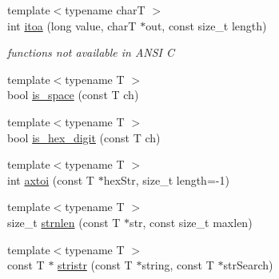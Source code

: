 \begin{DoxyCompactItemize}
\item 
\hypertarget{namespacestring__util_ad8c0e55cfd7dd74b275abd8f00d0bbd9}{{\footnotesize template$<$typename char\-T $>$ }\\int \hyperlink{namespacestring__util_ad8c0e55cfd7dd74b275abd8f00d0bbd9}{itoa} (long value, char\-T $\ast$out, const size\-\_\-t length)}\label{namespacestring__util_ad8c0e55cfd7dd74b275abd8f00d0bbd9}

\begin{DoxyCompactList}\small\item\em functions not available in A\-N\-S\-I C \end{DoxyCompactList}\item 
{\footnotesize template$<$typename T $>$ }\\bool \hyperlink{namespacestring__util_af93be700ec46644ae01efc6fda56b950}{is\-\_\-space} (const T ch)
\item 
{\footnotesize template$<$typename T $>$ }\\bool \hyperlink{namespacestring__util_af8c723187df1b5450e8c106ecb04a10a}{is\-\_\-hex\-\_\-digit} (const T ch)
\item 
{\footnotesize template$<$typename T $>$ }\\int \hyperlink{namespacestring__util_ae6e03e7a1706cfacce0cacc35f938f53}{axtoi} (const T $\ast$hex\-Str, size\-\_\-t length=-\/1)
\item 
{\footnotesize template$<$typename T $>$ }\\size\-\_\-t \hyperlink{namespacestring__util_aad6168510fd7ef18b0cf0a5d6c6e4e42}{strnlen} (const T $\ast$str, const size\-\_\-t maxlen)
\item 
\hypertarget{namespacestring__util_aefacc16446da64a7897ef698f5006b6e}{{\footnotesize template$<$typename T $>$ }\\const T $\ast$ \hyperlink{namespacestring__util_aefacc16446da64a7897ef698f5006b6e}{stristr} (const T $\ast$string, const T $\ast$str\-Search)}\label{namespacestring__util_aefacc16446da64a7897ef698f5006b6e}


\end{DoxyCompactItemize}

